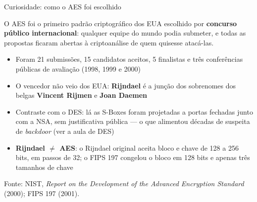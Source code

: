 \documentclass{beamer}
\begin{document}
\begin{frame}{Curiosidade: como o AES foi escolhido}
    \begin{tcolorbox}[colback=blue!5,colframe=blue!50!black,boxrule=0.5pt]
        \footnotesize
        O AES foi o primeiro padrão criptográfico dos EUA escolhido por \textbf{concurso público internacional}: qualquer equipe do mundo podia submeter, e todas as propostas ficaram abertas à criptoanálise de quem quisesse atacá-las.
    \end{tcolorbox}
    \medskip
    \begin{itemize}
        \footnotesize
        \item Foram 21 submissões, 15 candidatos aceitos, 5 finalistas e três conferências públicas de avaliação (1998, 1999 e 2000)
        \item O vencedor não veio dos EUA: \textbf{Rijndael} é a junção dos sobrenomes dos belgas \textbf{Vincent Rijmen} e \textbf{Joan Daemen}
        \item Contraste com o DES: lá as S-Boxes foram projetadas a portas fechadas junto com a NSA, sem justificativa pública --- o que alimentou décadas de suspeita de \textit{backdoor} (ver a aula de DES)
        \item \textbf{Rijndael $\neq$ AES}: o Rijndael original aceita bloco e chave de 128 a 256 bits, em passos de 32; o FIPS 197 congelou o bloco em 128 bits e apenas três tamanhos de chave
    \end{itemize}
    \smallskip
    {\tiny Fonte: NIST, \textit{Report on the Development of the Advanced Encryption Standard} (2000); FIPS 197 (2001).\par}
\end{frame}

\end{document}
